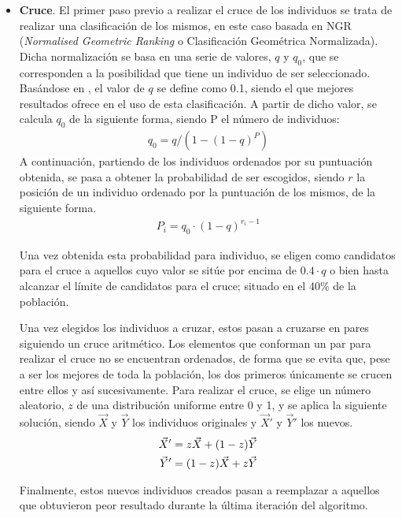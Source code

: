 \documentclass[11pt,spanish,listoffigures,listoftables]{tfgetsinf}
\begin{document}
\begin{itemize}
    \item \textbf{Cruce}. El primer paso previo a realizar el cruce de los individuos se trata de realizar una clasificación de los mismos, en este caso basada en NGR (\textit{Normalised Geometric Ranking} o Clasificación Geométrica Normalizada). Dicha normalización se basa en una serie de valores, $q$ y $q_0$, que se corresponden a la posibilidad que tiene un individuo de ser seleccionado. Basándose en \cite{GARZELLI2008223}, el valor de $q$ se define como 0.1, siendo el que mejores resultados ofrece en el uso de esta clasificación. A partir de dicho valor, se calcula $q_0$ de la siguiente forma, siendo P el número de individuos:
    \begin{align}
        q_{0} = q / (1 - (1 - q)^{P})
    \end{align}
    A continuación, partiendo de los individuos ordenados por su puntuación obtenida, se pasa a obtener la probabilidad de ser escogidos, siendo $r$ la posición de un individuo ordenado por la puntuación de los mismos, de la siguiente forma.
    \begin{align}
        P_{i} = q_{0} \cdot (1 - q)^{r_{i}-1} 
    \end{align}
    
    Una vez obtenida esta probabilidad para individuo, se eligen como candidatos para el cruce a aquellos cuyo valor se sitúe por encima de $0.4 \cdot q$ o bien hasta alcanzar el límite de candidatos para el cruce; situado en el 40\% de la población.
    
    Una vez elegidos los individuos a cruzar, estos pasan a cruzarse en pares siguiendo un cruce aritmético. Los elementos que conforman un par para realizar el cruce no se encuentran ordenados, de forma que se evita que, pese a ser los mejores de toda la población, los dos primeros únicamente se crucen entre ellos y así sucesivamente. Para realizar el cruce, se elige un número aleatorio, $z$ de una distribución uniforme entre 0 y 1, y se aplica la siguiente solución, siendo $\Vec{X}$ y $\Vec{Y}$ los individuos originales y $\Vec{X}'$ y $\Vec{Y}'$ los nuevos.
    \begin{align}
        \Vec{X}' = z\Vec{X} + (1-z)\Vec{Y} \notag\\
        \Vec{Y}' = (1-z)\Vec{X} + z\Vec{Y}
    \end{align}
    
    Finalmente, estos nuevos individuos creados pasan a reemplazar a aquellos que obtuvieron peor resultado durante la última iteración del algoritmo.
    

\end{itemize}
\end{document}
